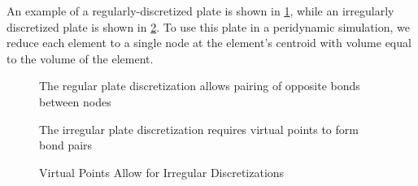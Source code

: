 An example of a regularly-discretized plate is shown in \cref{fig:regularmesh}, while an irregularly discretized plate is shown in \cref{fig:unevenmesh}.
To use this plate in a peridynamic simulation, we reduce each element to a single node at the element's centroid with volume equal to the volume of the element. 
%
%
\begin{figure}[h]
  \centering
  \resizebox{0.6\linewidth}{!}{}
  \caption[Regular Plate Discretization]{The regular plate discretization allows pairing of opposite bonds between nodes}
  \label{fig:regularmesh}
\end{figure}
%
\begin{figure}[tbhp]
  \centering
  \resizebox{0.6\linewidth}{!}{}
  \caption[Irregular Plate Discretization]{The irregular plate discretization requires virtual points to form bond pairs}
  \label{fig:unevenmesh}
\end{figure}
%
%
\begin{figure}[tbhp]
  \centering
  \resizebox{0.6\linewidth}{!}{}
  \caption{Virtual Points Allow for Irregular Discretizations}
  \label{fig:PlateIrreg}
\end{figure}
%

\FloatBarrier
